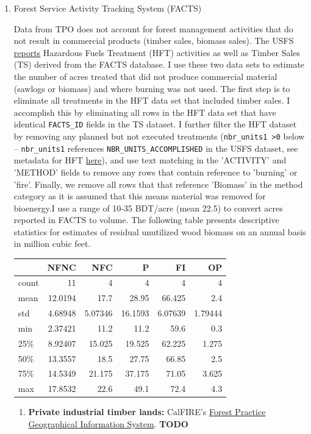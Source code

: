 \documentclass[a4paper]{article}
\begin{document}
\begin{enumerate}
\item Forest Service Activity Tracking System (FACTS)
\label{sec:orgheadline17}

Data from TPO does not account for forest management activities that do
not result in commercial products (timber sales, biomass sales). The
USFS
\href{http://data.fs.usda.gov/geodata/edw/datasets.php?dsetParent=Activities}{reports}
Hazardous Fuels Treatment (HFT) activities as well as Timber Sales (TS)
derived from the FACTS database. I use these two data sets to estimate
the number of acres treated that did not produce commercial material
(sawlogs or biomass) and where burning was not used. The first step is
to eliminate all treatments in the HFT data set that included timber
sales. I accomplish this by eliminating all rows in the HFT data set
that have identical \texttt{FACTS\_ID} fields in the TS dataset. I further
filter the HFT dataset by removing any planned but not executed
treatments (\texttt{nbr\_units1 >0} below -- \texttt{nbr\_units1} references
\texttt{NBR\_UNITS\_ACCOMPLISHED} in the USFS dataset, see metadata for HFT
\href{http://data.fs.usda.gov/geodata/edw/edw_resources/meta/S_USA.Activity_HazFuelTrt_PL.xml}{here}),
and use text matching in the 'ACTIVITY' and 'METHOD' fields to remove
any rows that contain reference to 'burning' or 'fire'. Finally, we
remove all rows that that reference 'Biomass' in the method category as
it is assumed that this means material was removed for bioenergy.I use a
range of 10-35 BDT/acre (mean 22.5) to convert acres reported in FACTS to volume.
The following table presents descriptive statistics for estimates of
residual unutilized wood biomass on an annual basis in million cubic
feet.

\begin{center}
\begin{tabular}{lrrrrr}
 & NFNC & NFC & P & FI & OP\\
\hline
count & 11 & 4 & 4 & 4 & 4\\
mean & 12.0194 & 17.7 & 28.95 & 66.425 & 2.4\\
std & 4.68948 & 5.07346 & 16.1593 & 6.07639 & 1.79444\\
min & 2.37421 & 11.2 & 11.2 & 59.6 & 0.3\\
25\% & 8.92407 & 15.025 & 19.525 & 62.225 & 1.275\\
50\% & 13.3557 & 18.5 & 27.75 & 66.85 & 2.5\\
75\% & 14.5349 & 21.175 & 37.175 & 71.05 & 3.625\\
max & 17.8532 & 22.6 & 49.1 & 72.4 & 4.3\\
\end{tabular}
\label{tab:orgtable5}


\end{center}
\begin{enumerate}
\item \textbf{Private industrial timber lands:} CalFIRE's
\href{http://www.calfire.ca.gov/resource_mgt/resource_mgt_forestpractice_gis}{Forest
Practice Geographical Information System}. \textbf{TODO}
\end{enumerate}
\end{enumerate}
\end{document}
